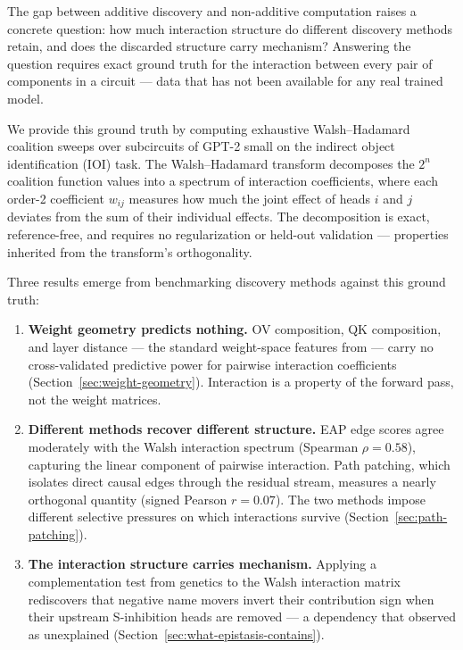 \documentclass{article}
\begin{document}
The gap between additive discovery and non-additive computation raises a
concrete question: how much interaction structure do different discovery
methods retain, and does the discarded structure carry mechanism? Answering
the question requires exact ground truth for the interaction between every pair
of components in a circuit --- data that has not been
available for any real trained model.

We provide this ground truth by computing exhaustive Walsh--Hadamard
coalition sweeps over subcircuits of GPT-2 small on the indirect object
identification (IOI) task. The Walsh--Hadamard transform decomposes the
$2^n$ coalition function values into a spectrum of interaction
coefficients, where each order-2 coefficient $w_{ij}$ measures how much
the joint effect of heads $i$ and $j$ deviates from the sum of their
individual effects. The decomposition is exact, reference-free, and
requires no regularization or held-out validation --- properties
inherited from the transform's orthogonality.

Three results emerge from benchmarking discovery methods against this
ground truth:

\begin{enumerate}
\item \textbf{Weight geometry predicts nothing.} OV composition, QK
  composition, and layer distance --- the standard weight-space features
  from \citet{elhage2021mathematical} --- carry no cross-validated
  predictive power for pairwise interaction coefficients
  (Section~\ref{sec:weight-geometry}). Interaction is a property of the
  forward pass, not the weight matrices.

\item \textbf{Different methods recover different structure.} EAP edge
  scores agree moderately with the Walsh interaction spectrum (Spearman
  $\rho = 0.58$), capturing the linear component of pairwise
  interaction. Path patching, which isolates direct causal edges through
  the residual stream, measures a nearly orthogonal quantity (signed
  Pearson $r = 0.07$). The two methods impose different selective
  pressures on which interactions survive
  (Section~\ref{sec:path-patching}).

\item \textbf{The interaction structure carries mechanism.} Applying a
  complementation test from genetics to the Walsh interaction matrix
  rediscovers that negative name movers invert their contribution sign
  when their upstream S-inhibition heads are removed --- a dependency
  that \citet{wang2022ioi} observed as unexplained
  (Section~\ref{sec:what-epistasis-contains}).
\end{enumerate}
\end{document}
